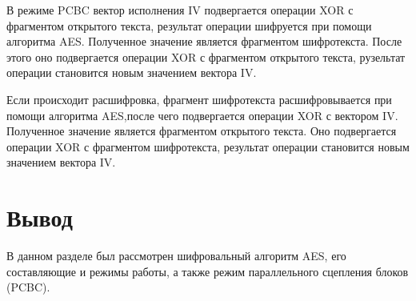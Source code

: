 В режиме PCBC вектор исполнения IV подвергается операции XOR с фрагментом открытого текста, результат операции шифруется при помощи алгоритма AES. Полученное значение является фрагментом шифротекста. После этого оно подвергается операции XOR с фрагментом открытого текста, рузельтат операции становится новым значением вектора IV.

Если происходит расшифровка, фрагмент шифротекста расшифровывается при помощи алгоритма AES,после чего подвергается операции XOR с вектором IV. Полученное значение является фрагментом открытого текста. Оно подвергается операции XOR с фрагментом шифротекста,  результат операции становится новым значением вектора IV.

\section*{Вывод}

В данном разделе был рассмотрен шифровальный алгоритм AES, его составляющие и режимы работы, а также режим параллельного сцепления блоков (PCBC).

